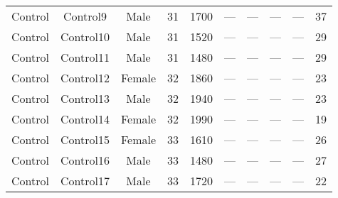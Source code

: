 \begin{sidewaystable}[h]
\begin{tabular}{ccccccp{2cm}p{2cm}cc}
Control & Control9 & Male & 31 & 1700 & — & — & — & — & 37 \\
Control & Control10 & Male & 31 & 1520 & — & — & — & — & 29 \\
Control & Control11 & Male & 31 & 1480 & — & — & — & — & 29 \\
Control & Control12 & Female & 32 & 1860 & — & — & — & — & 23 \\
Control & Control13 & Male & 32 & 1940 & — & — & — & — & 23 \\
Control & Control14 & Female & 32 & 1990 & — & — & — & — & 19 \\
Control & Control15 & Female & 33 & 1610 & — & — & — & — & 26 \\
Control & Control16 & Male & 33 & 1480 & — & — & — & — & 27 \\
Control & Control17 & Male & 33 & 1720 & — & — & — & — & 22 \\

\hline %
\end{tabular}
\label{tab:2demograph}
\end{sidewaystable}

